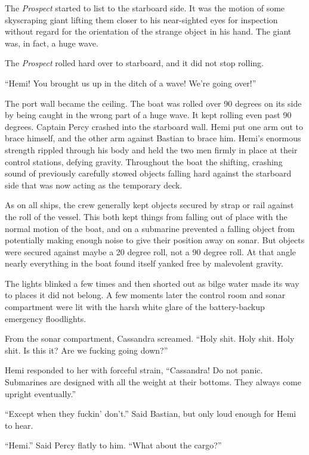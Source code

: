 \documentclass[]{scrbook}
\begin{document}
The \emph{Prospect} started to list to the starboard side. It was the
motion of some skyscraping giant lifting them closer to his near-sighted
eyes for inspection without regard for the orientation of the strange
object in his hand. The giant was, in fact, a huge wave.

The \emph{Prospect} rolled hard over to starboard, and it did not stop
rolling.

``Hemi! You brought us up in the ditch of a wave! We're going over!''

The port wall became the ceiling. The boat was rolled over 90 degrees on
its side by being caught in the wrong part of a huge wave. It kept
rolling even past 90 degrees. Captain Percy crashed into the starboard
wall. Hemi put one arm out to brace himself, and the other arm against
Bastian to brace him. Hemi's enormous strength rippled through his body
and held the two men firmly in place at their control stations, defying
gravity. Throughout the boat the shifting, crashing sound of previously
carefully stowed objects falling hard against the starboard side that
was now acting as the temporary deck.

As on all ships, the crew generally kept objects secured by strap or
rail against the roll of the vessel. This both kept things from falling
out of place with the normal motion of the boat, and on a submarine
prevented a falling object from potentially making enough noise to give
their position away on sonar. But objects were secured against maybe a
20 degree roll, not a 90 degree roll. At that angle nearly everything in
the boat found itself yanked free by malevolent gravity.

The lights blinked a few times and then shorted out as bilge water made
its way to places it did not belong. A few moments later the control
room and sonar compartment were lit with the harsh white glare of the
battery-backup emergency floodlights.

From the sonar compartment, Cassandra screamed. ``Holy shit. Holy shit.
Holy shit. Is this it? Are we fucking going down?''

Hemi responded to her with forceful strain, ``Cassandra! Do not panic.
Submarines are designed with all the weight at their bottoms. They
always come upright eventually.''

``Except when they fuckin' don't.'' Said Bastian, but only loud enough
for Hemi to hear.

``Hemi.'' Said Percy flatly to him. ``What about the cargo?''
\end{document}
